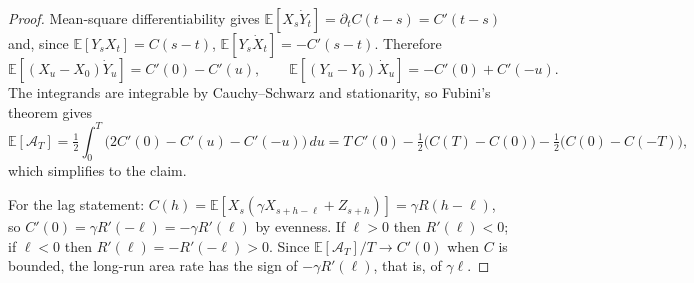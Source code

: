 \documentclass{article}
\theoremstyle{plain}
\theoremstyle{definition}
\theoremstyle{remark}
\newcommand{\E}{\mathbb{E}}
\begin{document}
\thmlevy*
\begin{proof}
Mean-square differentiability gives $\E[X_s\dot Y_t]=\partial_tC(t-s)=C'(t-s)$ and, since $\E[Y_sX_t]=C(s-t)$, $\E[Y_s\dot X_t]=-C'(s-t)$. Therefore
\[
  \E[(X_u-X_0)\dot Y_u]=C'(0)-C'(u),\qquad \E[(Y_u-Y_0)\dot X_u]=-C'(0)+C'(-u).
\]
The integrands are integrable by Cauchy--Schwarz and stationarity, so Fubini's theorem gives
\[
  \E[\mathcal{A}_T]=\tfrac12\int_0^T\big(2C'(0)-C'(u)-C'(-u)\big)\,du=T\,C'(0)-\tfrac12\big(C(T)-C(0)\big)-\tfrac12\big(C(0)-C(-T)\big),
\]
which simplifies to the claim.

For the lag statement:
$C(h)=\E[X_s(\gamma X_{s+h-\ell}+Z_{s+h})]=\gamma R(h-\ell)$, so $C'(0)=\gamma R'(-\ell)=-\gamma R'(\ell)$ by evenness. If $\ell>0$ then $R'(\ell)<0$; if $\ell<0$ then $R'(\ell)=-R'(-\ell)>0$.
Since $\E[\mathcal{A}_T]/T\to C'(0)$ when $C$ is bounded, the long-run area rate has the sign of $-\gamma R'(\ell)$, that is, of $\gamma\ell$.
\end{proof}
\end{document}
